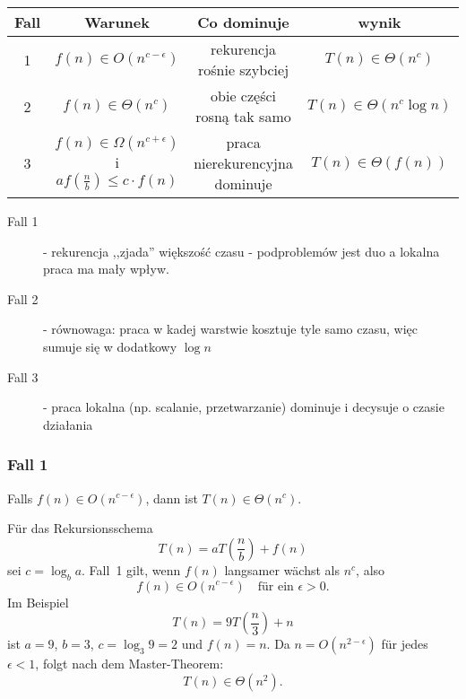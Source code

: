     \begin{table}[H]
        \centering
        \begin{tabular}{|c|c|c|c|}
            \hline
            \textbf{Fall} & \textbf{Warunek} & \textbf{Co dominuje} & \textbf{wynik} \\
            \hline
            1 & $f(n) \in O(n^{c - \epsilon})$ & rekurencja rośnie szybciej & $T(n) \in \Theta(n^c)$ \\
            2 & $f(n) \in \Theta (n^c)$ & obie części rosną tak samo & $T(n) \in \Theta (n^c \log n)$ \\
            3 & $f(n) \in \Omega(n^{c + \epsilon})$ i $af(\frac{n}{b}) \leq c \cdot f(n)$ & praca nierekurencyjna dominuje & $T(n) \in \Theta(f(n))$ \\
            \hline
        \end{tabular}
    \end{table}
    \begin{description}
        \item[Fall 1] - rekurencja ,,zjada'' większość czasu - podproblemów jest duo a lokalna praca ma mały wpływ.
        \item[Fall 2] - równowaga: praca w kadej warstwie kosztuje tyle samo czasu, więc sumuje się w dodatkowy $\log n$
        \item[Fall 3] - praca lokalna (np. scalanie, przetwarzanie) dominuje i decysuje o czasie działania 
    \end{description}


\subsubsection{Fall 1}
    \begin{tcolorbox}[blue = {Definition}]
        Falls $f(n) \in O(n^{c - \epsilon})$, dann ist $T(n) \in \Theta(n^{c})$.
    \end{tcolorbox}

        Für das Rekursionsschema 
        \[
        T(n) = aT\!\left(\frac{n}{b}\right) + f(n)
        \]
        sei $c = \log_b a$. 
        Fall~1 gilt, wenn $f(n)$ langsamer wächst als $n^c$, also
        \[
        f(n) \in O(n^{c - \epsilon}) \quad \text{für ein } \epsilon > 0.
        \]
        Im Beispiel 
        \[
        T(n) = 9T\!\left(\frac{n}{3}\right) + n
        \]
        ist $a = 9$, $b = 3$, $c = \log_3 9 = 2$ und $f(n) = n$. 
        Da $n = O(n^{2 - \epsilon})$ für jedes $\epsilon < 1$, 
        folgt nach dem Master-Theorem:
        \[
        T(n) \in \Theta(n^2).
        \]

